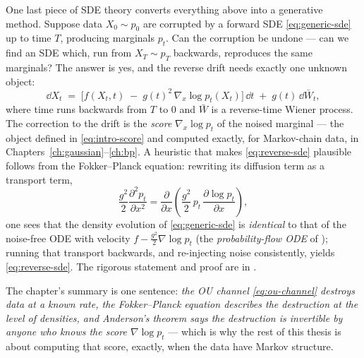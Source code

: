 One last piece of SDE theory converts everything above into a generative
method. Suppose data $X_0 \sim p_0$ are corrupted by a forward SDE
\eqref{eq:generic-sde} up to time $T$, producing marginals $p_t$. Can the
corruption be undone --- can we find an SDE which, run from
$X_T \sim p_T$ backwards, reproduces the same marginals? The answer
\citep{anderson1982reverse} is yes, and the reverse drift needs exactly one
unknown object:
\begin{equation}
  \dd X_t \;=\;
  \Big[ f(X_t, t) \;-\; g(t)^2\, \nabla_x \log p_t(X_t) \Big]\,\dd t
  \;+\; g(t)\, \dd \bar W_t ,
  \label{eq:reverse-sde}
\end{equation}
where time runs backwards from $T$ to $0$ and $\bar W$ is a reverse-time
Wiener process. The correction to the drift is the \emph{score}
$\nabla_x \log p_t$ of the noised marginal --- the object defined in
\eqref{eq:intro-score} and computed exactly, for Markov-chain data,
in Chapters~\ref{ch:gaussian}--\ref{ch:bp}. A heuristic that makes
\eqref{eq:reverse-sde} plausible follows from the Fokker--Planck equation:
rewriting its diffusion term as a transport term,
\begin{equation*}
  \frac{g^2}{2} \frac{\partial^2 p_t}{\partial x^2}
  = \frac{\partial}{\partial x}\!\left(
      \frac{g^2}{2}\, p_t\, \frac{\partial \log p_t}{\partial x}
    \right),
\end{equation*}
one sees that the density evolution of \eqref{eq:generic-sde} is
\emph{identical} to that of the noise-free ODE with velocity
$f - \tfrac{g^2}{2} \nabla \log p_t$ (the \emph{probability-flow ODE} of
\citealp{song2021scorebased}); running that transport backwards, and
re-injecting noise consistently, yields \eqref{eq:reverse-sde}. The rigorous
statement and proof are in \citet{anderson1982reverse}.

The chapter's summary is one sentence: \emph{the OU channel
\eqref{eq:ou-channel} destroys data at a known rate, the Fokker--Planck
equation describes the destruction at the level of densities, and
Anderson's theorem says the destruction is invertible by anyone who knows
the score $\nabla \log p_t$} --- which is why the rest of this thesis is
about computing that score, exactly, when the data have Markov structure.
